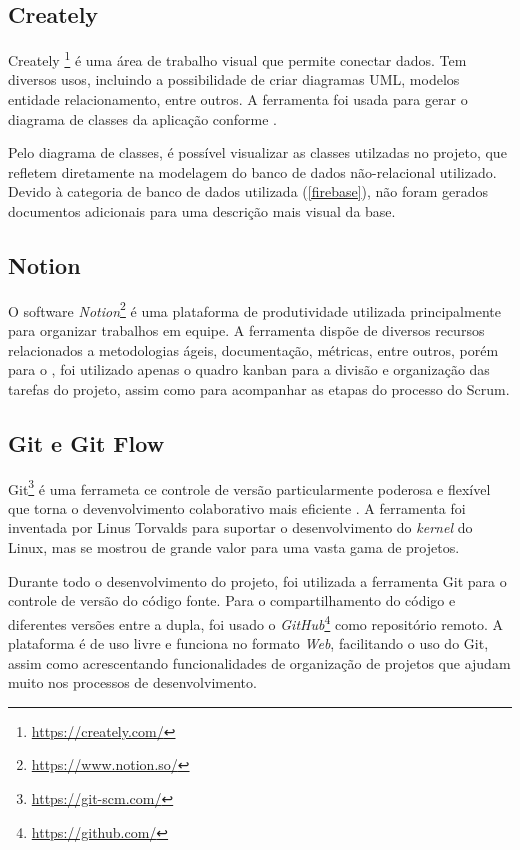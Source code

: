 \subsection{Creately}

Creately \footnote{\url{https://creately.com/}} é uma área de trabalho visual que permite conectar dados. Tem diversos usos, incluindo a possibilidade de criar diagramas UML, modelos entidade relacionamento, entre outros. A ferramenta foi usada para gerar o diagrama de classes da aplicação conforme .


Pelo diagrama de classes, é possível visualizar as classes utilzadas no projeto, que refletem diretamente na modelagem do banco de dados não-relacional utilizado. Devido à categoria de banco de dados utilizada (\ref{firebase}), não foram gerados documentos adicionais para uma descrição mais visual da base.

\subsection{Notion}

O software \textit{Notion}\footnote{\url{https://www.notion.so/}} é uma plataforma de produtividade utilizada principalmente para organizar trabalhos em equipe. A ferramenta dispõe de diversos recursos relacionados a metodologias ágeis, documentação, métricas, entre outros, porém para o \appName, foi utilizado apenas o quadro kanban para a divisão e organização das tarefas do projeto, assim como para acompanhar as etapas do processo do Scrum.

\subsection{Git e Git Flow}

Git\footnote{\url{https://git-scm.com/}} é uma ferrameta ce controle de versão particularmente poderosa e flexível que torna o devenvolvimento colaborativo mais eficiente \cite{git}. A ferramenta foi inventada por Linus Torvalds para suportar o desenvolvimento do \textit{kernel} do Linux, mas se mostrou de grande valor para uma vasta gama de projetos.

Durante todo o desenvolvimento do projeto, foi utilizada a ferramenta Git para o controle de versão do código fonte. Para o compartilhamento do código e diferentes versões entre a dupla, foi usado o \textit{GitHub}\footnote{\url{https://github.com/}} como repositório remoto. A plataforma é de uso livre e funciona no formato \textit{Web}, facilitando o uso do Git, assim como acrescentando funcionalidades de organização de projetos que ajudam muito nos processos de desenvolvimento.

